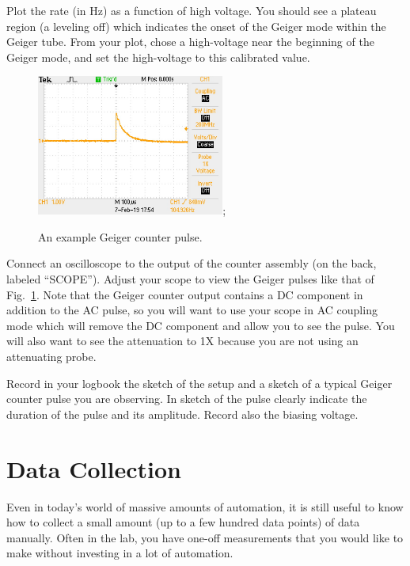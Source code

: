 \begin{plot} Plot the rate (in Hz) as a function of high voltage.
You should see a plateau region (a leveling off) which indicates the
onset of the Geiger mode within the Geiger tube.  From your plot,
chose a high-voltage near the beginning of the Geiger mode, and set
the high-voltage to this calibrated value. \end{plot}

\begin{figure}[htbp]
\begin{center}
 \includegraphics[width=0.55\textwidth]{figs/labs/geiger/pulse.jpg};
\caption{\label{fig:geigerpulse} An example Geiger counter pulse.}
\end{center}
\end{figure}

Connect an oscilloscope to the output of the counter assembly (on the
back, labeled ``SCOPE'').  Adjust your scope to view the Geiger pulses
like that of Fig.~\ref{fig:geigerpulse}.  Note that the Geiger counter
output contains a DC component in addition to the AC pulse, so you
will want to use your scope in AC coupling mode which will remove the
DC component and allow you to see the pulse.  You will also want to
see the attenuation to 1X because you are not using an attenuating
probe. 

\begin{measurement} Record in your logbook the sketch of the setup and a sketch of a typical Geiger counter pulse you are observing. In sketch of the pulse clearly indicate the duration of the pulse and its amplitude. Record also the biasing voltage. 
\end{measurement}




\section{Data Collection}

Even in today's world of massive amounts of automation, it is still
useful to know how to collect a small amount (up to a few hundred data
points) of data manually.  Often in the lab, you have one-off
measurements that you would like to make without investing in a lot of
automation.

